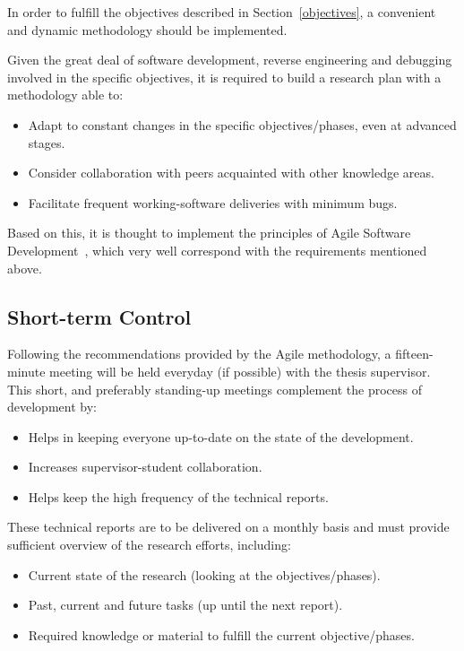 In order to fulfill the objectives described in Section~\ref{objectives}, a convenient and dynamic methodology should be implemented.

Given the great deal of software development, reverse engineering and debugging involved in the specific objectives, it is required to build a research plan with a methodology able to: 
\begin{itemize}
	\item Adapt to constant changes in the specific objectives/phases, even at advanced stages.
	\item Consider collaboration with peers acquainted with other knowledge areas.
	\item Facilitate frequent working-software deliveries with minimum bugs.
\end{itemize}

Based on this, it is thought to implement the principles of Agile Software Development~\cite{agileAlliance,agileManifesto}, which very well correspond with the requirements mentioned above.

\subsection{Short-term Control}\label{shot-termContol}
Following the recommendations provided by the Agile methodology, a fifteen-minute meeting will be held everyday (if possible) with the thesis supervisor. This short, and preferably standing-up meetings complement the process of development by:

\begin{itemize}
	\item Helps in keeping everyone up-to-date on the state of the development.
	\item Increases supervisor-student collaboration.
	\item Helps keep the high frequency of the technical reports.
\end{itemize}

These technical reports are to be delivered on a monthly basis and must provide sufficient overview of the research efforts, including:

\begin{itemize}
	\item Current state of the research (looking at the objectives/phases).
	\item Past, current and future tasks (up until the next report).
	\item Required knowledge or material to fulfill the current objective/phases.
\end{itemize}

